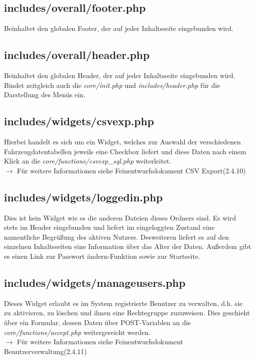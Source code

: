 \documentclass[fontsize = 12pt, paper = a4]{scrreprt}
\begin{document}
\subsection{includes/overall/footer.php}
Beinhaltet den globalen Footer, der auf jeder Inhaltsseite eingebunden wird.

\subsection{includes/overall/header.php}
Beinhaltet den globalen Header, der auf jeder Inhaltsseite eingebunden wird. Bindet zeitgleich auch die \textit{core/init.php} und \textit{includes/header.php} für die Darstellung des Menüs ein.

\subsection{includes/widgets/csvexp.php}
Hierbei handelt es sich um ein Widget, welches zur Auswahl der verschiedenen Fahrzeugdatentabellen jeweils eine Checkbox liefert und diese Daten nach einem Klick an die \textit{core/functions/csvexp\_sql.php} weiterleitet.\\
$\rightarrow$ Für weitere Informationen siehe Feinentwurfsdokument \glqq CSV Export\grqq (2.4.10)

\subsection{includes/widgets/loggedin.php}
Dies ist kein Widget wie es die anderen Dateien dieses Ordners sind. Es wird stets im Header eingebunden und liefert im eingeloggten Zustand eine namentliche Begrüßung des aktiven Nutzers. Desweiteren liefert es auf den einzelnen Inhaltsseiten eine Information über das Alter der Daten. Außerdem gibt es einen Link zur \glqq Passwort ändern\grqq-Funktion sowie zur Startseite.

\subsection{includes/widgets/manageusers.php}
Dieses Widget erlaubt es im System registrierte Benutzer zu verwalten, d.h. sie zu aktivieren, zu löschen und ihnen eine Rechtegruppe zuzuweisen. Dies geschieht über ein Formular, dessen Daten über POST-Variablen an die \textit{core/functions/accept.php} weitergereicht werden.\\
$\rightarrow$ Für weitere Informationen siehe Feinentwurfsdokument \glqq Benutzerverwaltung\grqq (2.4.11)
\end{document}
